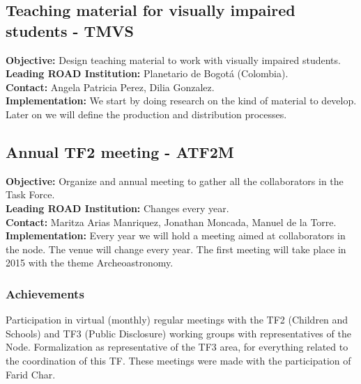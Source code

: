 \subsection{Teaching material for visually impaired students - TMVS}
\textbf{Objective:} Design teaching material to work with visually impaired students.
\\
\textbf{Leading ROAD Institution:} Planetario de Bogotá (Colombia).
\\
\textbf{Contact:} Angela Patricia Perez, Dilia Gonzalez.
\\
\textbf{Implementation:} We start by doing research on the kind of material to develop. Later on we will define the production and distribution processes.



\subsection{Annual TF2 meeting - ATF2M}
\textbf{Objective:} Organize and annual meeting to gather all the collaborators in the Task Force.
\\
\textbf{Leading ROAD Institution:} Changes every year.
\\
\textbf{Contact:} Maritza Arias Manriquez, Jonathan Moncada, Manuel de la Torre.
\\
\textbf{Implementation:} Every year we will hold a meeting aimed at collaborators in the node. The venue will change every year. The first meeting will take place in 2015 with the theme Archeoastronomy.

\subsubsection{Achievements}

Participation in virtual (monthly) regular meetings with the TF2 (Children and Schools) and TF3 (Public Disclosure) working groups with representatives of the Node. Formalization as representative of the TF3 area, for everything related to the coordination of this TF. These meetings were made with the participation of Farid Char.

